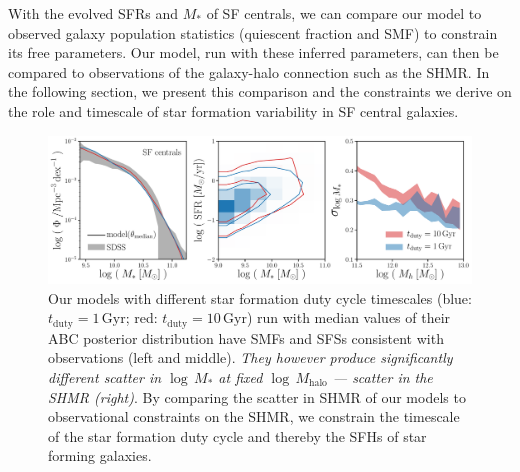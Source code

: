 \documentclass[12pt, letterpaper, preprint, tighten]{aastex62}
\begin{document}
With the evolved SFRs and $M_*$ of SF centrals, we can compare our model 
to observed galaxy population statistics (quiescent fraction 
and SMF) to constrain its free parameters. Our model, run with these 
inferred parameters, can then be compared to observations of the galaxy-halo 
connection such as the SHMR. In the following section, we present this 
comparison and the constraints we derive on the role and timescale of 
star formation variability in SF central galaxies.

\begin{figure}
\begin{center}
\includegraphics[width=\textwidth]{figs/qaplot_abc.pdf}
    \caption{Our models with different star formation duty cycle timescales 
    (blue: $t_\mathrm{duty}{=}1\,\mathrm{Gyr}$; red: $t_\mathrm{duty}{=}10\,\mathrm{Gyr}$) 
    run with median values of their ABC posterior distribution have SMFs and SFSs consistent 
    with observations (left and middle). \emph{They however produce significantly different 
    scatter in $\log\,M_*$ at fixed $\log\,M_\mathrm{halo}$ --- scatter in the SHMR (right)}. 
    By comparing the scatter in SHMR of our models to observational constraints on the SHMR, 
    we constrain the timescale of the star formation duty cycle and thereby the SFHs of star 
    forming galaxies.
    }
\label{fig:abc_demo}
\end{center}
\end{figure}
\end{document}
